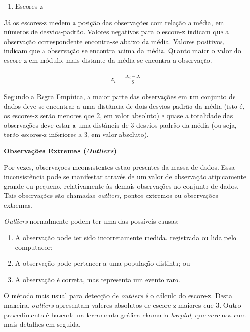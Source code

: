 \documentclass[
]{book}
\providecommand{\tightlist}{%
  \setlength{\itemsep}{0pt}\setlength{\parskip}{0pt}}
\theoremstyle{definition}
\theoremstyle{definition}
\theoremstyle{definition}
\theoremstyle{remark}
\begin{document}
\begin{enumerate}
\def\labelenumi{\alph{enumi}.}
\setcounter{enumi}{1}
\tightlist
\item
  Escores-z
\end{enumerate}

Já os escores-z medem a posição das observações com relação a média, em números de desvios-padrão. Valores negativos para o escore-z indicam que a observação correspondente encontra-se abaixo da média. Valores positivos, indicam que a observação se encontra acima da média. Quanto maior o valor do escore-z em módulo, mais distante da média se encontra a observação.

\begin{align*}
  z_i = \frac{X_i - \bar{X}}{S}
\end{align*}

Segundo a Regra Empírica, a maior parte das observações em um conjunto de dados deve se encontrar a uma distância de dois desvios-padrão da média (isto é, os escores-z serão menores que 2, em valor absoluto) e quase a totalidade das observações deve estar a uma distância de 3 desvios-padrão da média (ou seja, terão escores-z inferiores a 3, em valor absoluto).

\textbf{Observações Extremas (\emph{Outliers})}

Por vezes, observações inconsistentes estão presentes da massa de dados. Essa inconsistência pode se manifestar através de um valor de observação atipicamente grande ou pequeno, relativamente às demais observações no conjunto de dados. Tais observações são chamadas \emph{outliers}, pontos extremos ou observações extremas.

\emph{Outliers} normalmente podem ter uma das possíveis causas:

\begin{enumerate}
\def\labelenumi{(\arabic{enumi})}
\tightlist
\item
  A observação pode ter sido incorretamente medida, registrada ou lida pelo computador;\\
\item
  A observação pode pertencer a uma população distinta; ou\\
\item
  A observação é correta, mas representa um evento raro.
\end{enumerate}

O método mais usual para detecção de \emph{outliers} é o cálculo do escore-z. Desta maneira, \emph{outliers} apresentam valores absolutos de escore-z maiores que 3. Outro procedimento é baseado na ferramenta gráfica chamada \emph{boxplot}, que veremos com mais detalhes em seguida.
\end{document}
